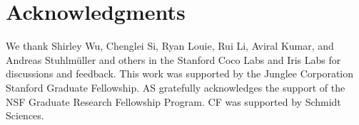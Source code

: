 
\section{Acknowledgments}
We thank Shirley Wu, Chenglei Si, Ryan Louie, Rui Li, Aviral Kumar, and Andreas Stuhlmüller and others in the Stanford Coco Labs and Iris Labs for discussions and feedback. This work was supported by the Junglee Corporation Stanford Graduate Fellowship. AS gratefully acknowledges the support of the NSF Graduate Research Fellowship Program. CF was supported by Schmidt Sciences.

